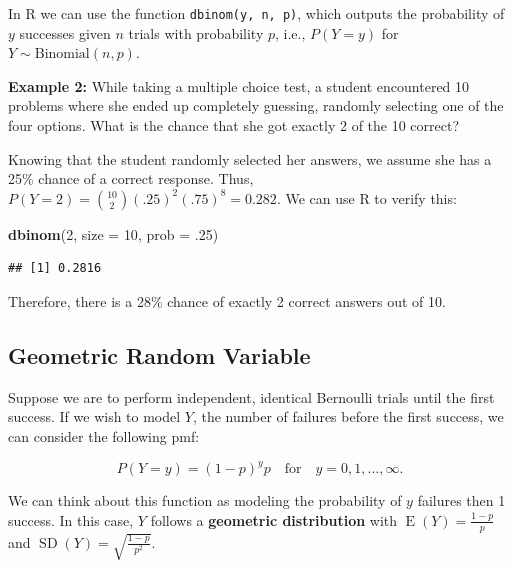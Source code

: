 \documentclass[
]{krantz}
\newenvironment{Shaded}{\begin{snugshade}}{\end{snugshade}}
\newcommand{\DataTypeTok}[1]{\textcolor[rgb]{0.27,0.27,0.27}{#1}}
\newcommand{\DecValTok}[1]{\textcolor[rgb]{0.06,0.06,0.06}{#1}}
\newcommand{\FloatTok}[1]{\textcolor[rgb]{0.06,0.06,0.06}{#1}}
\newcommand{\KeywordTok}[1]{\textcolor[rgb]{0.27,0.27,0.27}{\textbf{#1}}}
\newcommand{\NormalTok}[1]{#1}
\newcommand{\E}{\operatorname{E}}
\newcommand{\SD}{\operatorname{SD}}
\begin{document}
In R we can use the function \texttt{dbinom(y,\ n,\ p)}, which outputs the probability of \(y\) successes given \(n\) trials with probability \(p\), i.e., \(P(Y=y)\) for \(Y \sim \textrm{Binomial}(n,p)\).

\textbf{Example 2:} While taking a multiple choice test, a student encountered 10 problems where she ended up completely guessing, randomly selecting one of the four options. What is the chance that she got exactly 2 of the 10 correct?

Knowing that the student randomly selected her answers, we assume she has a 25\% chance of a correct response. Thus, \(P(Y=2) = {10 \choose 2}(.25)^2(.75)^8 = 0.282\). We can use R to verify this:

\begin{Shaded}
\begin{Highlighting}[]
\KeywordTok{dbinom}\NormalTok{(}\DecValTok{2}\NormalTok{, }\DataTypeTok{size =} \DecValTok{10}\NormalTok{, }\DataTypeTok{prob =} \FloatTok{.25}\NormalTok{)}
\end{Highlighting}
\end{Shaded}

\begin{verbatim}
## [1] 0.2816
\end{verbatim}

Therefore, there is a 28\% chance of exactly 2 correct answers out of 10.

\hypertarget{geometric-random-variable}{%
\subsection{Geometric Random Variable}\label{geometric-random-variable}}

Suppose we are to perform independent, identical Bernoulli trials until the first success. If we wish to model \(Y\), the number of failures before the first success, we can consider the following pmf:

\begin{equation}
P(Y=y) = (1-p)^yp \quad \textrm{for}\quad y = 0, 1, \ldots, \infty.
\label{eq:geomRV}
\end{equation}

We can think about this function as modeling the probability of \(y\) failures then 1 success. In this case, \(Y\) follows a \textbf{geometric distribution}  with \(\E(Y) = \frac{1-p}p\) and \(\SD(Y) = \sqrt{\frac{1-p}{p^2}}\).
\end{document}
